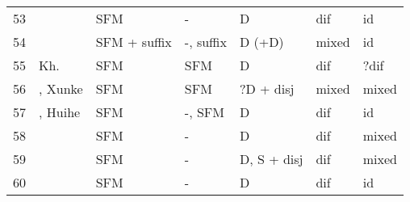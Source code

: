 \begin{tabularx}{\textwidth}{rQQQQQQ}
53 &  & SFM & {}- & D & dif & id\\
54 &  & SFM + suffix & {}-, suffix & D (+D) & mixed & id\\
55 & Kh.  & SFM & SFM & D & dif & ?dif\\
56 & , Xunke & SFM & SFM & ?D + disj & mixed & mixed\\
57 & , Huihe & SFM & {}-, SFM & D & dif & id\\
58 &  & SFM & {}- & D & dif & mixed\\
59 &  & SFM & {}- & D, S + disj & dif & mixed\\
60 &  & SFM & {}- & D & dif & id\\
\end{tabularx}

